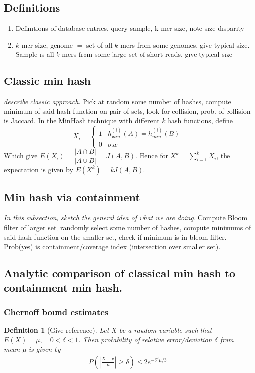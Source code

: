 \documentclass[11pt]{amsart}
\newtheorem{definition}{Definition}[section]
\theoremstyle{remark}
\numberwithin{equation}{section}
\begin{document}
\subsection{Definitions}
\begin{enumerate}
\item Definitions of database entries, query sample, k-mer size, note size disparity
\item $k$-mer size, genome $=$ set of all $k$-mers from some genomes, give typical size. Sample is all $k$-mers from some large set of short reads, give typical size
\end{enumerate}

\subsection{Classic min hash}
\textit{describe classic approach.}
Pick at random some number of hashes, compute minimum of said hash function on pair of sets, look for collision, prob. of collision is Jaccard.
In the MinHash technique with different $k$ hash functions, define
$$X_i=\left\{
\begin{array}{lll}
1 &h^{(i)}_{min}(A)=h^{(i)}_{min}(B)\\
0& o.w
\end{array}
\right.$$
Which give 
$E(X_i)= \dfrac{|A\cap B|}{|A\cup B|}=J(A,B)$.
Hence for 
$X^k=\sum\limits_{i=1}^k X_i$,
the expectation is given by %
$E(X^k)=k J(A,B)$.

\subsection{Min hash via containment}
\textit{In this subsection, sketch the general idea of what we are doing.}
Compute Bloom filter of larger set, randomly select some number of hashes, compute minimums of said hash function on the smaller set, check if minimum is in bloom filter. Prob(yes) is containment/coverage index (intersection over smaller set).


\subsection{Analytic comparison of classical min hash to containment min hash.}
\subsubsection{Chernoff bound estimates}
\label{section:ChernoffBounds}
\begin{definition}[Give reference]
\label{def:GeneralChernoffBounds}
Let $X$ be a random variable such that $E(X)=\mu,\quad 0<\delta<1$. Then probability of relative error/deviation $\delta$ from mean $\mu$ is given by
\begin{align*}
P\left(\left|\frac{X-\mu}{\mu}\right|\geq\delta\right)\leq2e^{-\delta^2\mu/3}
\end{align*}
\end{definition}
\end{document}
